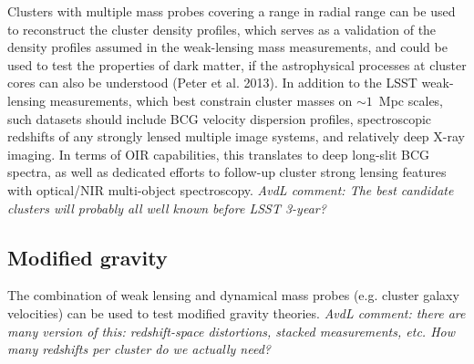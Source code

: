 Clusters with multiple mass probes covering a range in radial range can be used to reconstruct the cluster density profiles, which serves as a validation of the density profiles assumed in the weak-lensing mass measurements, and could be used to test the properties of dark matter, if the astrophysical processes at cluster cores can also be understood (Peter et al. 2013).  In addition to the LSST weak-lensing measurements, which best constrain cluster masses on $\sim1$~Mpc scales, such datasets should include BCG velocity dispersion profiles, spectroscopic redshifts of any strongly lensed multiple image systems, and relatively deep X-ray imaging. In terms of OIR capabilities, this translates to deep long-slit BCG spectra, as well as dedicated efforts to follow-up cluster strong lensing features with optical/NIR multi-object spectroscopy.  {\it AvdL comment: The best candidate clusters will probably all well known before LSST 3-year?}

\subsection{Modified gravity}

The combination of weak lensing and dynamical mass probes (e.g. cluster galaxy velocities) can be used to test modified gravity theories.  {\it AvdL comment: there are many version of this: redshift-space distortions, stacked measurements, etc.  How many redshifts per cluster do we actually need?}

